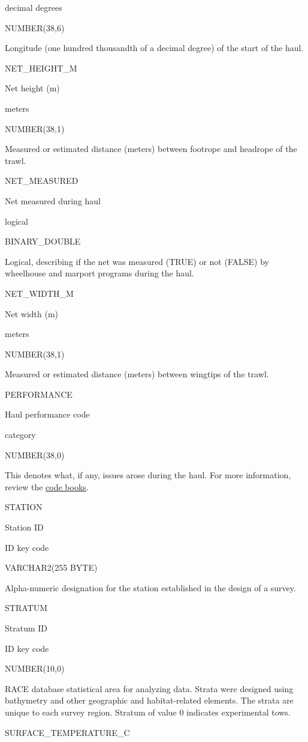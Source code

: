 \documentclass[
  letterpaper,
  oneside,
  open=any]{scrbook}
\begin{document}
decimal degrees

NUMBER(38,6)

Longitude (one hundred thousandth of a decimal degree) of the start of
the haul.

NET\_HEIGHT\_M

Net height (m)

meters

NUMBER(38,1)

Measured or estimated distance (meters) between footrope and headrope of
the trawl.

NET\_MEASURED

Net measured during haul

logical

BINARY\_DOUBLE

Logical, describing if the net was measured (TRUE) or not (FALSE) by
wheelhouse and marport programs during the haul.

NET\_WIDTH\_M

Net width (m)

meters

NUMBER(38,1)

Measured or estimated distance (meters) between wingtips of the trawl.

PERFORMANCE

Haul performance code

category

NUMBER(38,0)

This denotes what, if any, issues arose during the haul. For more
information, review the
\href{https://www.fisheries.noaa.gov/resource/document/groundfish-survey-species-code-manual-and-data-codes-manual}{code
books}.

STATION

Station ID

ID key code

VARCHAR2(255 BYTE)

Alpha-numeric designation for the station established in the design of a
survey.

STRATUM

Stratum ID

ID key code

NUMBER(10,0)

RACE database statistical area for analyzing data. Strata were designed
using bathymetry and other geographic and habitat-related elements. The
strata are unique to each survey region. Stratum of value 0 indicates
experimental tows.

SURFACE\_TEMPERATURE\_C
\end{document}

